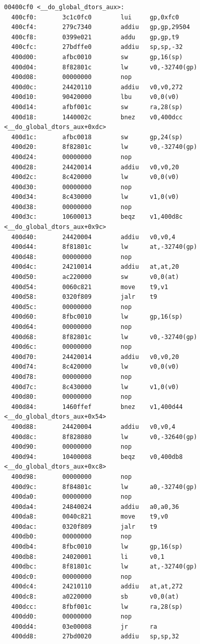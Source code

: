 \documentclass[11pt]{article}
\begin{document}
\begin{verbatim}
00400cf0 <__do_global_dtors_aux>:
  400cf0:       3c1c0fc0        lui     gp,0xfc0
  400cf4:       279c7340        addiu   gp,gp,29504
  400cf8:       0399e021        addu    gp,gp,t9
  400cfc:       27bdffe0        addiu   sp,sp,-32
  400d00:       afbc0010        sw      gp,16(sp)
  400d04:       8f82801c        lw      v0,-32740(gp)
  400d08:       00000000        nop
  400d0c:       24420110        addiu   v0,v0,272
  400d10:       90420000        lbu     v0,0(v0)
  400d14:       afbf001c        sw      ra,28(sp)
  400d18:       1440002c        bnez    v0,400dcc <__do_global_dtors_aux+0xdc>
  400d1c:       afbc0018        sw      gp,24(sp)
  400d20:       8f82801c        lw      v0,-32740(gp)
  400d24:       00000000        nop
  400d28:       24420014        addiu   v0,v0,20
  400d2c:       8c420000        lw      v0,0(v0)
  400d30:       00000000        nop
  400d34:       8c430000        lw      v1,0(v0)
  400d38:       00000000        nop
  400d3c:       10600013        beqz    v1,400d8c <__do_global_dtors_aux+0x9c>
  400d40:       24420004        addiu   v0,v0,4
  400d44:       8f81801c        lw      at,-32740(gp)
  400d48:       00000000        nop
  400d4c:       24210014        addiu   at,at,20
  400d50:       ac220000        sw      v0,0(at)
  400d54:       0060c821        move    t9,v1
  400d58:       0320f809        jalr    t9
  400d5c:       00000000        nop
  400d60:       8fbc0010        lw      gp,16(sp)
  400d64:       00000000        nop
  400d68:       8f82801c        lw      v0,-32740(gp)
  400d6c:       00000000        nop
  400d70:       24420014        addiu   v0,v0,20
  400d74:       8c420000        lw      v0,0(v0)
  400d78:       00000000        nop
  400d7c:       8c430000        lw      v1,0(v0)
  400d80:       00000000        nop
  400d84:       1460ffef        bnez    v1,400d44 <__do_global_dtors_aux+0x54>
  400d88:       24420004        addiu   v0,v0,4
  400d8c:       8f828080        lw      v0,-32640(gp)
  400d90:       00000000        nop
  400d94:       10400008        beqz    v0,400db8 <__do_global_dtors_aux+0xc8>
  400d98:       00000000        nop
  400d9c:       8f84801c        lw      a0,-32740(gp)
  400da0:       00000000        nop
  400da4:       24840024        addiu   a0,a0,36
  400da8:       0040c821        move    t9,v0
  400dac:       0320f809        jalr    t9
  400db0:       00000000        nop
  400db4:       8fbc0010        lw      gp,16(sp)
  400db8:       24020001        li      v0,1
  400dbc:       8f81801c        lw      at,-32740(gp)
  400dc0:       00000000        nop
  400dc4:       24210110        addiu   at,at,272
  400dc8:       a0220000        sb      v0,0(at)
  400dcc:       8fbf001c        lw      ra,28(sp)
  400dd0:       00000000        nop
  400dd4:       03e00008        jr      ra
  400dd8:       27bd0020        addiu   sp,sp,32


\end{verbatim}
\end{document}
